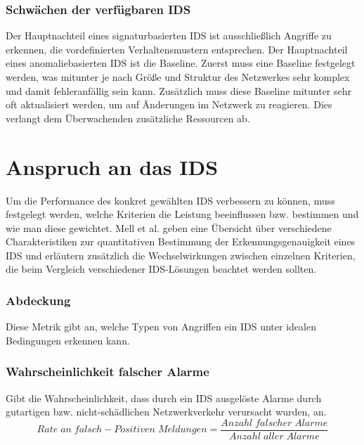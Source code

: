 \subsubsection{Schwächen der verfügbaren IDS}
Der Hauptnachteil eines signaturbasierten IDS ist ausschließlich Angriffe zu erkennen, die vordefinierten Verhaltensmustern entsprechen. Der Hauptnachteil eines anomaliebasierten IDS ist die Baseline. Zuerst muss eine Baseline festgelegt werden, was mitunter je nach Größe und Struktur des Netzwerkes sehr komplex und damit fehleranfällig sein kann. Zusätzlich muss diese Baseline mitunter sehr oft aktualisiert werden, um auf Änderungen im Netzwerk zu reagieren. Dies verlangt dem Überwachenden zusätzliche Ressourcen ab.
\section{Anspruch an das IDS}
Um die Performance des konkret gewählten IDS verbessern zu können, muss festgelegt werden, welche Kriterien die Leistung beeinflussen bzw. bestimmen und wie man diese gewichtet.
Mell et al. \cite{mell2003overview} geben eine Übersicht über verschiedene Charakteristiken zur quantitativen Bestimmung der Erkennungsgenauigkeit eines IDS und erläutern zusätzlich die Wechselwirkungen zwischen einzelnen Kriterien, die beim Vergleich verschiedener IDS-Lösungen beachtet werden sollten.
\subsubsection{Abdeckung}
Diese Metrik gibt an, welche Typen von Angriffen ein IDS unter idealen Bedingungen erkennen kann.
\subsubsection{Wahrscheinlichkeit falscher Alarme}
Gibt die Wahrscheinlichkeit, dass durch ein IDS ausgelöste Alarme durch gutartigen bzw. nicht-schädlichen Netzwerkverkehr verursacht wurden, an.\\
\[Rate\;an\;falsch-Positiven\;Meldungen = \frac{Anzahl\;falscher\;Alarme}{Anzahl\;aller\;Alarme}\]
